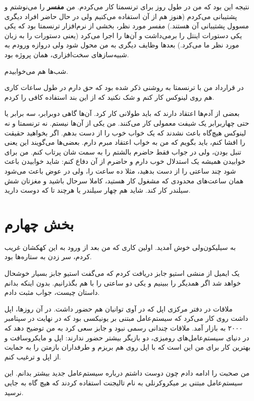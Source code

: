 نتیجه این بود که من در طول روز برای ترنسمتا کار می‌کردم. من
\textbf{مفسر } را می‌نوشتم و پشتیبانی می‌کردم (هنوز هم از آن
استفاده می‌کنیم ولی در حال حاضر افراد دیگری مسوول پشتیبانی آن هستند.)
مفسر مورد نظر، بخشی از نرم‌افزار ترنسمتا بود که یکی یکی دستورات اینتل
را برمی‌داشت و آن‌ها را اجرا می‌کرد (یعنی دستورات  را به زبان
مورد نظر ما  می‌کرد.) بعدها وظایف دیگری به من محول شود
ولی دروازه ورودم به شبیه‌سازهای سخت‌افزاری، همان پروژه بود.

شب‌ها هم می‌خوابیدم.

در قرارداد من با ترنسمتا به روشنی ذکر شده بود که حق دارم در طول ساعات
کاری هم روی لینوکس کار کنم و شک نکنید که از این بند استفاده کافی را
کردم.

بعضی از آدم‌ها اعتقاد دارند که باید طولانی کار کرد. آن‌ها گاهی دوبرابر،
سه برابر یا حتی چهاربرابر یک شیفت معمولی کار می‌کنند. من یکی از آن‌ها
نیستم. نه ترنسمتا و نه لینوکس هیچ‌گاه باعث نشدند که یک خواب خوب را از
دست بدهم. اگر بخواهید حقیقت را افشا کنم، باید بگویم که من به خواب
اعتقاد مبرم دارم. بعضی‌ها می‌گویند این یعنی تنبل بودن، ولی در جواب فقط
حاضرم بالشتم را به سمت شان پرتاب کنم. من برای خوابیدن همیشه یک استدلال
خوب دارم و حاضرم از آن دفاع کنم: شاید خوابیدن باعث شود چند ساعتی را از
دست بدهید، مثلا ده ساعت را، ولی در عوض باعث می‌شود همان ساعت‌های محدودی
که مشغول کار هستید، کاملا سرحال باشید و مغزتان شش سیلندر کار کند. شاید
هم چهار سیلندر یا هرچند تا که دوست دارید.

\section{بخش چهارم}
به سیلیکون‌ولی خوش آمدید. اولین کاری که من بعد از ورود به این کهکشان
غریب کردم، سر زدن به ستاره‌ها بود.

یک ایمیل از منشی استیو جابز دریافت کردم که می‌گفت استیو جابز بسیار
خوشحال خواهد شد اگر همدیگر را ببینیم و یکی دو ساعتی را با هم
بگذرانیم. بدون اینکه بدانم داستان چیست، جواب مثبت دادم.

ملاقات در دفتر مرکزی اپل که در آوی توانیان هم
حضور داشت. در آن روزها، اپل داشت روی  کار می‌کرد که
سیستم‌عامل مبتنی بر یونیکسی بود که در نهایت در سپتامبر ۲۰۰۰ به بازار
آمد. ملاقات چندانی رسمی نبود و جابز سعی کرد به من توضیح دهد که در
دنیای سیستم‌عامل‌های رومیزی، دو بازیگر بیشتر حضور ندارند: اپل و
مایکروسافت و بهترین کار برای من این است که با اپل روی هم بریزم و
طرفداران بازمتن را به حمایت از اپل و  ترغیب کنم.

من صحبت را ادامه دادم چون دوست داشتم درباره سیستم‌عامل جدید بیشتر
بدانم. این سیستم‌عامل مبتنی بر میکروکرنلی به نام
تالیجنت استفاده کردند که هیچ گاه به جایی نرسید.

